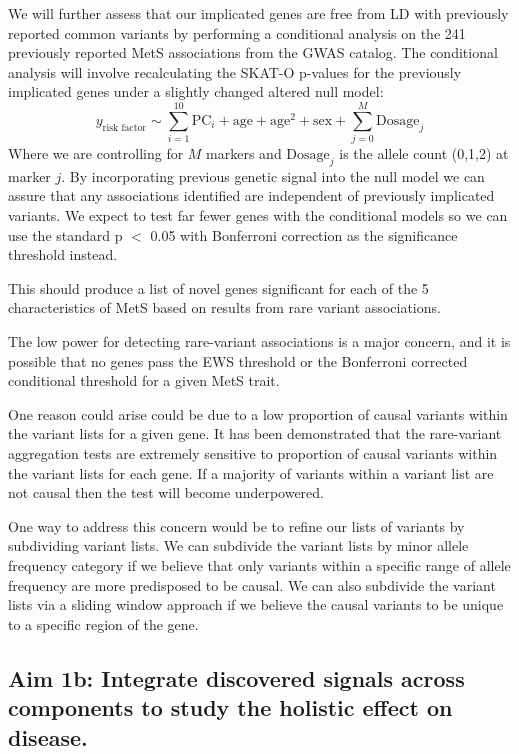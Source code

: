 \documentclass[11pt]{article}
\begin{document}
We will further assess that our implicated genes are free from LD with previously reported common variants by performing a conditional analysis on the 241 previously reported MetS associations from the GWAS catalog. The conditional analysis will involve recalculating the SKAT-O p-values for the previously implicated genes under a slightly changed altered null model:
$$y_{\text{risk factor}} \sim \sum_{i=1}^{10} \text{PC}_i + \text{age} + \text{age}^2 + \text{sex} + \sum_{j=0}^{M}\text{Dosage}_j$$
Where we are controlling for $M$ markers and $\text{Dosage}_j$ is the allele count (0,1,2) at marker $j$. By incorporating previous genetic signal into the null model we can assure that any associations identified are independent of previously implicated variants. We expect to test far fewer genes with the conditional models so we can use the standard p $<$ 0.05 with Bonferroni correction as the significance threshold instead.

This should produce a list of novel genes significant for each of the 5 characteristics of MetS based on results from rare variant associations.

\noindent {} 

The low power for detecting rare-variant associations is a major concern, and it is possible that no genes pass the EWS threshold or the Bonferroni corrected conditional threshold for a given MetS trait.

One reason could arise could be due to a low proportion of causal variants within the variant lists for a given gene. It has been demonstrated that the rare-variant aggregation tests are extremely sensitive to proportion of causal variants within the variant lists for each gene. If a majority of variants within a variant list are not causal then the test will become underpowered. 

One way to address this concern would be to refine our lists of variants by subdividing variant lists. We can subdivide the variant lists by minor allele frequency category if we believe that only variants within a specific range of allele frequency are more predisposed to be causal. We can also subdivide the variant lists via a sliding window approach if we believe the causal variants to be unique to a specific region of the gene.

\subsection*{Aim 1b: Integrate discovered signals across components to study the holistic effect on disease.} 
\end{document}

